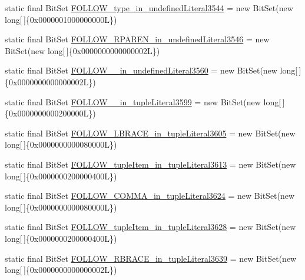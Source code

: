 \begin{DoxyCompactItemize}
static final Bit\-Set \hyperlink{classorg_1_1tzi_1_1use_1_1parser_1_1shell_1_1_shell_command_parser_a0fde5ee241870d00c7b174d10b71cf6c}{F\-O\-L\-L\-O\-W\-\_\-type\-\_\-in\-\_\-undefined\-Literal3544} = new Bit\-Set(new long\mbox{[}$\,$\mbox{]}\{0x0000001000000000\-L\})
\item 
static final Bit\-Set \hyperlink{classorg_1_1tzi_1_1use_1_1parser_1_1shell_1_1_shell_command_parser_ae9047101773a354138e4be8faac632c9}{F\-O\-L\-L\-O\-W\-\_\-\-R\-P\-A\-R\-E\-N\-\_\-in\-\_\-undefined\-Literal3546} = new Bit\-Set(new long\mbox{[}$\,$\mbox{]}\{0x0000000000000002\-L\})
\item 
static final Bit\-Set \hyperlink{classorg_1_1tzi_1_1use_1_1parser_1_1shell_1_1_shell_command_parser_ac5a38863597c5800ed811a44a8ba67ce}{F\-O\-L\-L\-O\-W\-\_\-\_\-in\-\_\-undefined\-Literal3560} = new Bit\-Set(new long\mbox{[}$\,$\mbox{]}\{0x0000000000000002\-L\})
\item 
static final Bit\-Set \hyperlink{classorg_1_1tzi_1_1use_1_1parser_1_1shell_1_1_shell_command_parser_ad3e269ec2aedf191b2d237c07b7b9129}{F\-O\-L\-L\-O\-W\-\_\-\_\-in\-\_\-tuple\-Literal3599} = new Bit\-Set(new long\mbox{[}$\,$\mbox{]}\{0x0000000000200000\-L\})
\item 
static final Bit\-Set \hyperlink{classorg_1_1tzi_1_1use_1_1parser_1_1shell_1_1_shell_command_parser_a52a7da36abc44143c75f046ace797b33}{F\-O\-L\-L\-O\-W\-\_\-\-L\-B\-R\-A\-C\-E\-\_\-in\-\_\-tuple\-Literal3605} = new Bit\-Set(new long\mbox{[}$\,$\mbox{]}\{0x0000000000080000\-L\})
\item 
static final Bit\-Set \hyperlink{classorg_1_1tzi_1_1use_1_1parser_1_1shell_1_1_shell_command_parser_aa08102f3f0a785482732de5f3600e326}{F\-O\-L\-L\-O\-W\-\_\-tuple\-Item\-\_\-in\-\_\-tuple\-Literal3613} = new Bit\-Set(new long\mbox{[}$\,$\mbox{]}\{0x0000000200000400\-L\})
\item 
static final Bit\-Set \hyperlink{classorg_1_1tzi_1_1use_1_1parser_1_1shell_1_1_shell_command_parser_a0407ddaf2a30d0a686c54364fc510e06}{F\-O\-L\-L\-O\-W\-\_\-\-C\-O\-M\-M\-A\-\_\-in\-\_\-tuple\-Literal3624} = new Bit\-Set(new long\mbox{[}$\,$\mbox{]}\{0x0000000000080000\-L\})
\item 
static final Bit\-Set \hyperlink{classorg_1_1tzi_1_1use_1_1parser_1_1shell_1_1_shell_command_parser_ada12ec3b1c76dada459b4bb22ac7bfc5}{F\-O\-L\-L\-O\-W\-\_\-tuple\-Item\-\_\-in\-\_\-tuple\-Literal3628} = new Bit\-Set(new long\mbox{[}$\,$\mbox{]}\{0x0000000200000400\-L\})
\item 
static final Bit\-Set \hyperlink{classorg_1_1tzi_1_1use_1_1parser_1_1shell_1_1_shell_command_parser_a1c57a06349b2d5205b9641c7cffdabfc}{F\-O\-L\-L\-O\-W\-\_\-\-R\-B\-R\-A\-C\-E\-\_\-in\-\_\-tuple\-Literal3639} = new Bit\-Set(new long\mbox{[}$\,$\mbox{]}\{0x0000000000000002\-L\})

\end{DoxyCompactItemize}
